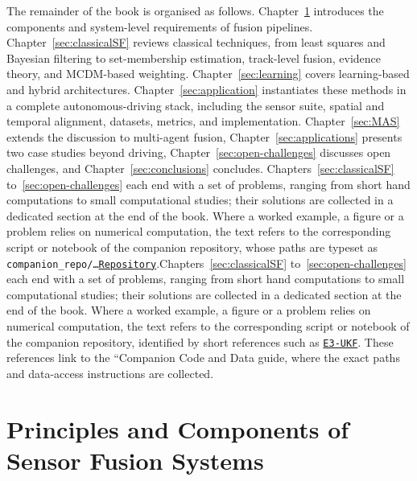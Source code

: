 \documentclass[graybox,envcountchap]{style/SNmono}
\newcommand{\repopath}[1]{\texttt{#1}}
\providecommand{\DIFadd}[1]{{\protect\color{blue} #1}} %
\providecommand{\DIFdel}[1]{{\protect\color{red} #1}} %
\DeclareRobustCommand{\RtwoDel}[1]{{\color{red}%
  \renewcommand{\DIFadd}[1]{##1}\renewcommand{\DIFdel}[1]{##1}%
  #1}}
\DeclareRobustCommand{\RtwoAdd}[1]{{\color{blue}#1}}
\DeclareRobustCommand{\codeentry}[1]{\hyperref[code:#1]{\texttt{#1}}}
\begin{document}
The remainder of the book is organised as follows. Chapter~\ref{sec:Principles} introduces the components and system-level requirements of fusion pipelines. Chapter~\ref{sec:classicalSF} reviews classical techniques, from least squares and Bayesian filtering to set-membership estimation, track-level fusion, evidence theory, and MCDM-based weighting. Chapter~\ref{sec:learning} covers learning-based and hybrid architectures. Chapter~\ref{sec:application} instantiates these methods in a complete autonomous-driving stack, including the sensor suite, spatial and temporal alignment, datasets, metrics, and implementation. Chapter~\ref{sec:MAS} extends the discussion to multi-agent fusion, Chapter~\ref{sec:applications} presents two case studies beyond driving, Chapter~\ref{sec:open-challenges} discusses open challenges, and Chapter~\ref{sec:conclusions} concludes.
\RtwoDel{Chapters~\ref{sec:classicalSF} to~\ref{sec:open-challenges} each end with a set of problems, ranging from short hand computations to small computational studies; their solutions are collected in a dedicated section at the end of the book. Where a worked example, a figure or a problem relies on numerical computation, the text refers to the corresponding script or notebook of the companion repository, whose paths are typeset as \RtwoDel{\repopath{companion\_\allowbreak repo/\allowbreak \ldots}}\RtwoAdd{\codeentry{Repository}}.}\RtwoAdd{Chapters~\ref{sec:classicalSF} to~\ref{sec:open-challenges} each end with a set of problems, ranging from short hand computations to small computational studies; their solutions are collected in a dedicated section at the end of the book. Where a worked example, a figure or a problem relies on numerical computation, the text refers to the corresponding script or notebook of the companion repository, identified by short references such as \codeentry{E3-UKF}. These references link to the ``Companion Code and Data guide, where the exact paths and data-access instructions are collected.}






\clearpage

\clearpage

\chapter{Principles and Components of Sensor Fusion Systems}
\label{sec:Principles}
\end{document}

